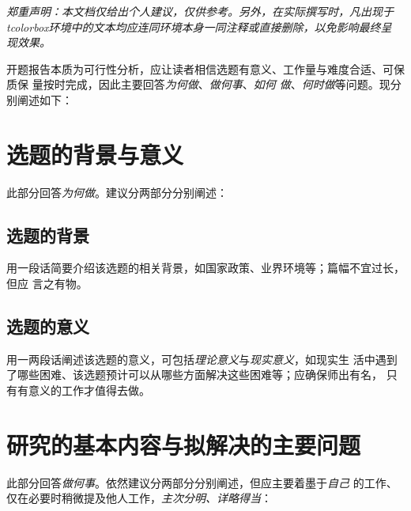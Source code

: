 \begin{tcolorbox}
	\emph{郑重声明：本文档仅给出个人建议，仅供参考。另外，在实际撰写时，凡出现于
		tcolorbox环境中的文本均应连同环境本身一同注释或直接删除，以免影响最终呈
		现效果。}
\end{tcolorbox}

\begin{tcolorbox}
	开题报告本质为可行性分析，应让读者相信选题有意义、工作量与难度合适、可保质保
	量按时完成，因此主要回答\emph{为何做}、\emph{做何事}、\emph{如何
		做}、\emph{何时做}等问题。现分别阐述如下：
\end{tcolorbox}

\section{选题的背景与意义}

\begin{tcolorbox}
	此部分回答\emph{为何做}。建议分两部分分别阐述：
\end{tcolorbox}

\subsection{选题的背景}

\begin{tcolorbox}
	用一段话简要介绍该选题的相关背景，如国家政策、业界环境等；篇幅不宜过长，但应
	言之有物。
\end{tcolorbox}

\subsection{选题的意义}

\begin{tcolorbox}
	用一两段话阐述该选题的意义，可包括\emph{理论意义}与\emph{现实意义}，如现实生
	活中遇到了哪些困难、该选题预计可以从哪些方面解决这些困难等；应确保师出有名，
	只有有意义的工作才值得去做。
\end{tcolorbox}

\section{研究的基本内容与拟解决的主要问题}

\begin{tcolorbox}
	此部分回答\emph{做何事}。依然建议分两部分分别阐述，但应主要着墨于\emph{自己}
	的工作、仅在必要时稍微提及他人工作，\emph{主次分明、详略得当}：
\end{tcolorbox}


